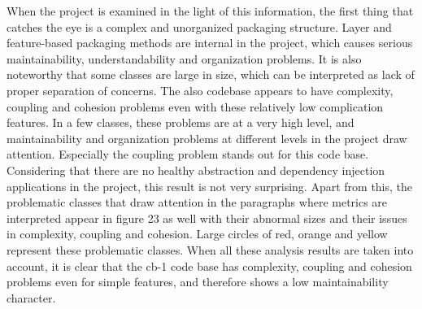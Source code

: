  When the project is examined in the light of this information, the first thing that catches the eye is a complex and unorganized packaging structure. Layer and feature-based packaging methods are internal in the project, which causes serious maintainability, understandability and organization problems. It is also noteworthy that some classes are large in size, which can be interpreted as lack of proper separation of concerns. The also codebase appears to have complexity, coupling and cohesion problems even with these relatively low complication features. In a few classes, these problems are at a very high level, and maintainability and organization problems at different levels in the project draw attention. Especially the coupling problem stands out for this code base. Considering that there are no healthy abstraction and dependency injection applications in the project, this result is not very surprising. Apart from this, the problematic classes that draw attention in the paragraphs where metrics are interpreted appear in figure 23 as well with their abnormal sizes and their issues in complexity, coupling and cohesion. Large circles of red, orange and yellow represent these problematic classes. When all these analysis results are taken into account, it is clear that the cb-1 code base has complexity, coupling and cohesion problems even for simple features, and therefore shows a low maintainability character.